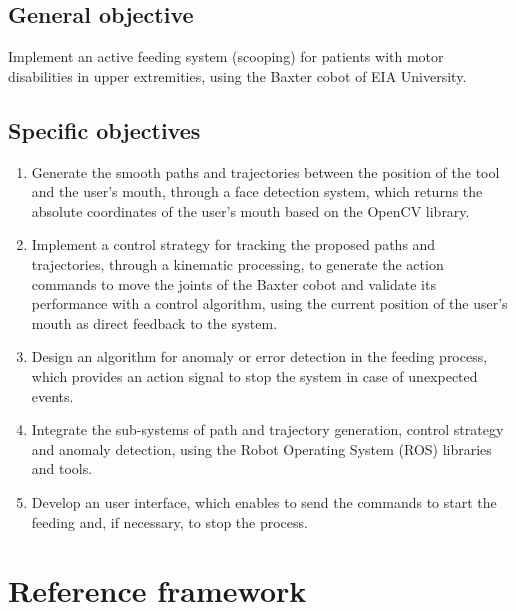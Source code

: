 \documentclass[11pt]{report} %
\begin{document}
\subsection{General objective}

Implement an active feeding system (scooping) for patients with motor disabilities in upper extremities, using the Baxter cobot of EIA University.

\subsection{Specific objectives}

\begin{enumerate}

\item Generate the smooth paths and trajectories between the position of the tool and the user's mouth, through a face detection system, which returns the absolute coordinates of the user's mouth based on the OpenCV library.

\item Implement a control strategy for tracking the proposed paths and trajectories, through a kinematic processing, to generate the action commands to move the joints of the Baxter cobot and validate its performance with a control algorithm, using the current position of the user's mouth as direct feedback to the system.

\item Design an algorithm for anomaly or error detection in the feeding process, which provides an action signal to stop the system in case of unexpected events.

\item Integrate the sub-systems of path and trajectory generation, control strategy and anomaly detection, using the Robot Operating System (ROS) libraries and tools.

\item Develop an user interface, which enables to send the commands to start the feeding and, if necessary, to stop the process.

\end{enumerate}


\newpage

\section{Reference framework}
\end{document}
